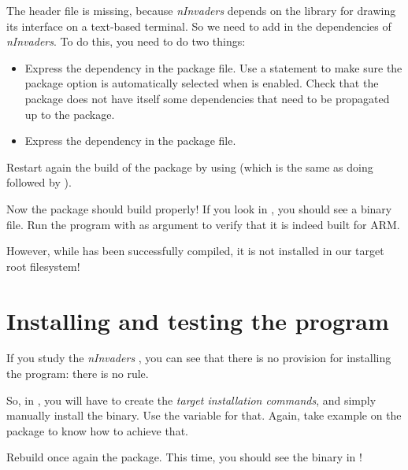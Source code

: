 The  header file is missing, because {\em nInvaders}
depends on the  library for drawing its interface on a
text-based terminal. So we need to add  in the
dependencies of {\em nInvaders}. To do this, you need to do two
things:

\begin{itemize}

\item Express the dependency in the package  file. Use
  a  statement to make sure the  package
  option is automatically selected when  is
  enabled. Check that the  package does not have itself
  some dependencies that need to be propagated up to the
   package.

\item Express the dependency in the package  file.

\end{itemize}

Restart again the build of the package by using
 (which is the same as doing
 followed by ).

Now the package should build properly! If you look in
, you should see a
 binary file. Run the  program with
 as argument to verify that it is indeed built for
ARM.

However, while  has been successfully compiled, it is
not installed in our target root filesystem!

\section{Installing and testing the program}

If you study the {\em nInvaders} , you can see that
there is no provision for installing the program: there is no
 rule.

So, in , you will have to create the {\em target
  installation commands}, and simply manually install the
 binary. Use the  variable for
that. Again, take example on the  package to know how to
achieve that.

Rebuild once again the  package. This time, you should
see the  binary in !

